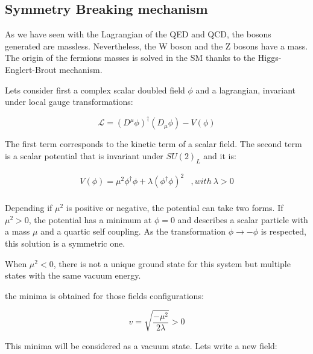     \subsection{Symmetry Breaking mechanism}
    
    As we have seen with the Lagrangian of the QED and QCD, the bosons generated are massless. Nevertheless, the W boson and the Z bosons have a mass. 
    The origin of the fermions masses is solved in the SM thanks to the Higgs-Englert-Brout mechanism.

    Lets consider first a complex scalar doubled field $\phi$ and a lagrangian, invariant under local gauge transformations:

    \begin{equation}
      \mathcal{L} = \left(D^{\mu} \phi \right)^{\dagger} \left( D_{\mu} \phi \right) - V(\phi)
      \label{eq:lagrangianHiggs}
    \end{equation}             

    The first term corresponds to the kinetic term of a scalar field.
    The second term is a scalar potential that is invariant under $SU(2)_L$ and it is:

    \begin{equation}
      \begin{array}{lr}
        V(\phi) = \mu^{2}\phi^{\dagger}\phi + \lambda \left(\phi^{\dagger}\phi\right)^2  & , with \ \lambda > 0 \\
      \end{array}   
    \end{equation}
    
    Depending if $\mu^{2}$ is positive or negative, the potential can take two forms.
    If $\mu^{2} > 0$, the potential has a minimum at $\phi = 0$ and describes a scalar particle with a mass $\mu$ and a quartic self coupling.
    As the transformation $\phi \rightarrow  - \phi$ is respected, this solution is a symmetric one.

    When $\mu^{2} < 0$, there is not a unique ground state for this system but multiple states with the same vacuum energy.
    
    the minima is obtained for those fields configurations:

    \begin{equation}
      v = \sqrt{\frac{- \mu^2}{2\lambda}} > 0
    \end{equation}

    This minima will be considered as a vacuum state.
    Lets write a new field:

